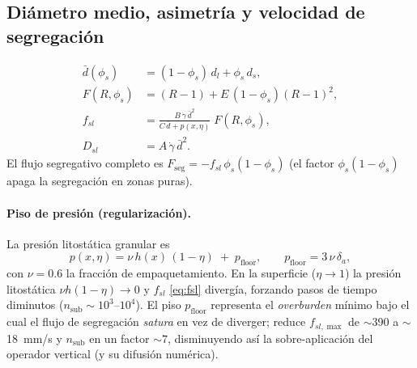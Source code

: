 \documentclass[11pt,a4paper]{article}
\begin{document}
\subsection{Diámetro medio, asimetría y velocidad de segregación}
\begin{align}
    \bar d(\phi_s) &= (1-\phi_s)\,d_l + \phi_s\,d_s, \\
    F(R,\phi_s) &= (R-1) + E\,(1-\phi_s)(R-1)^2, \\
    f_{sl} &= \frac{B\,\dot\gamma\,\bar d^2}{C\,\bar d + p(x,\eta)}\;F(R,\phi_s),
    \label{eq:fsl}\\
    D_{sl} &= A\,\dot\gamma\,\bar d^2 .
    \label{eq:Dsl}
\end{align}
El flujo segregativo completo es $F_{\mathrm{seg}}=-f_{sl}\,\phi_s(1-\phi_s)$
(el factor $\phi_s(1-\phi_s)$ apaga la segregación en zonas puras).

\paragraph{Piso de presión (regularización).}
La presión litostática granular es
\begin{equation}
    p(x,\eta) = \nu\,h(x)\,(1-\eta) \;+\; p_{\mathrm{floor}},
    \qquad p_{\mathrm{floor}} = 3\,\nu\,\delta_a ,
    \label{eq:p}
\end{equation}
con $\nu=0.6$ la fracción de empaquetamiento. En la superficie
($\eta\to1$) la presión litostática $\nu h(1-\eta)\to0$ y $f_{sl}$
\eqref{eq:fsl} divergía, forzando pasos de tiempo diminutos
($n_{\mathrm{sub}}\sim10^3$--$10^4$). El piso $p_{\mathrm{floor}}$
representa el \emph{overburden} mínimo bajo el cual el flujo de segregación
\emph{satura} en vez de diverger; reduce $f_{sl,\max}$ de $\sim$390 a
$\sim$18~mm/s y $n_{\mathrm{sub}}$ en un factor $\sim7$, disminuyendo así
la sobre-aplicación del operador vertical (y su difusión numérica).
\end{document}
